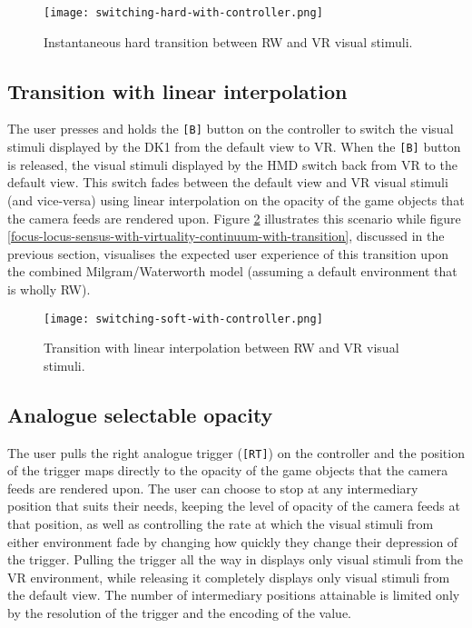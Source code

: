 \begin{figure}[h]
	\begin{center}
		\texttt{[image: switching-hard-with-controller.png]}
		\caption{Instantaneous hard transition between RW and VR visual stimuli.}
		\label{scenario1}
	\end{center}
\end{figure}


\subsection{Transition with linear interpolation}
\label{transition-with-linear-interpolation}
The user presses and holds the \texttt{[B]} button on the controller to switch the visual stimuli displayed by the DK1 from the default view to VR. When the \texttt{[B]} button is released, the visual stimuli displayed by the HMD switch back from VR to the default view. This switch fades between the default view and VR visual stimuli (and vice-versa) using linear interpolation on the opacity of the game objects that the camera feeds are rendered upon. Figure \ref{scenario12} illustrates this scenario while figure \ref{focus-locus-sensus-with-virtuality-continuum-with-transition}, discussed in the previous section, visualises the expected user experience of this transition upon the combined Milgram/Waterworth model (assuming a default environment that is wholly RW).

\begin{figure}[h]
	\begin{center}
		\texttt{[image: switching-soft-with-controller.png]}
		\caption{Transition with linear interpolation between RW and VR visual stimuli.}
		\label{scenario12}
	\end{center}
\end{figure}


\subsection{Analogue selectable opacity}
\label{analogue-selectable-opacity}
The user pulls the right analogue trigger (\texttt{[RT]}) on the controller and the position of the trigger maps directly to the opacity of the game objects that the camera feeds are rendered upon. The user can choose to stop at any intermediary position that suits their needs, keeping the level of opacity of the camera feeds at that position, as well as controlling the rate at which the visual stimuli from either environment fade by changing how quickly they change their depression of the trigger. Pulling the trigger all the way in displays only visual stimuli from the VR environment, while releasing it completely displays only visual stimuli from the default view. The number of intermediary positions attainable is limited only by the resolution of the trigger and the encoding of the value.

